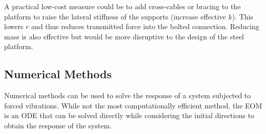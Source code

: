 \documentclass[12pt,letter]{article}
\begin{document}
\begin{example}
A practical low-cost measure could be to add cross-cables or bracing to the platform to raise the lateral stiffness of the supports (increase effective $k$). This lowers $r$ and thus reduces transmitted force into the bolted connection. Reducing mass is also effective but would be more disruptive to the design of the steel platform.

  
  \end{example}   

\pagebreak

 \subsection{Numerical Methods}
 
  Numerical methods can be used to solve the response of a system subjected to forced vibrations. While not the most computationally efficient method, the EOM is an ODE that can be solved directly while considering the initial directions to obtain the response of the system. 
\end{document}
